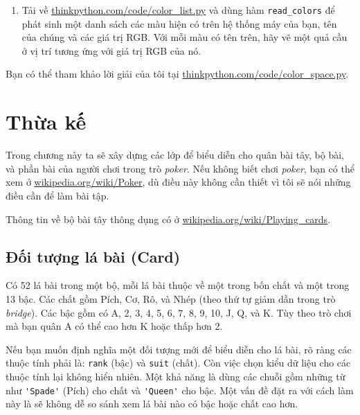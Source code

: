 \documentclass[11pt]{book}
\begin{document}
\begin{ex}
\begin{enumerate}

\item Tải về \url{thinkpython.com/code/color_list.py}
và dùng hàm \verb"read_colors" để phát sinh một danh sách
các màu hiện có trên hệ thống máy của bạn, tên của chúng và
các giá trị RGB. Với mỗi màu có tên trên, hãy vẽ một quả cầu ở
vị trí tương ứng với giá trị RGB của nó.



\end{enumerate}

Bạn có thể tham khảo lời giải của tôi tại \url{thinkpython.com/code/color_space.py}.

\end{ex}


\chapter{Thừa kế}

Trong chương này ta sẽ xây dựng các lớp để biểu diễn cho quân bài tây,
bộ bài, và phần bài của người chơi trong trò {\em poker}. Nếu không biết
 chơi {\em poker}, bạn có thể xem ở \url{wikipedia.org/wiki/Poker}, dù điều này
không cần thiết vì tôi sẽ nói những điều cần để làm bài tập.


Thông tin về bộ bài tây thông dụng có ở \url{wikipedia.org/wiki/Playing_cards}.


\section{Đối tượng lá bài (Card)}

Có 52 lá bài trong một bộ, mỗi lá bài thuộc về một trong bốn chất
và một trong 13 bậc. Các chất gồm Pích, Cơ, Rô, và Nhép (theo thứ
tự giảm dần trong trò {\em bridge}). Các bậc gồm có 
A, 2, 3, 4, 5, 6, 7, 8, 9, 10, J, Q, và K. Tùy theo trò chơi mà bạn
quân A có thể cao hơn K hoặc thấp hơn 2.


Nếu bạn muốn định nghĩa một đối tượng mới để biểu diễn cho lá bài,
rõ ràng các thuộc tính phải là: {\tt rank} (bậc) và
{\tt suit} (chất). Còn việc chọn kiểu dữ liệu cho các thuộc tính lại không
hiển nhiên. Một khả năng là dùng các chuỗi gồm những từ như 
\verb"'Spade'" (Pích) cho chất và \verb"'Queen'" cho bậc. Một vấn đề đặt ra
với cách làm này là sẽ không dễ so sánh xem lá bài nào có bậc hoặc chất
cao hơn.
\end{document}
